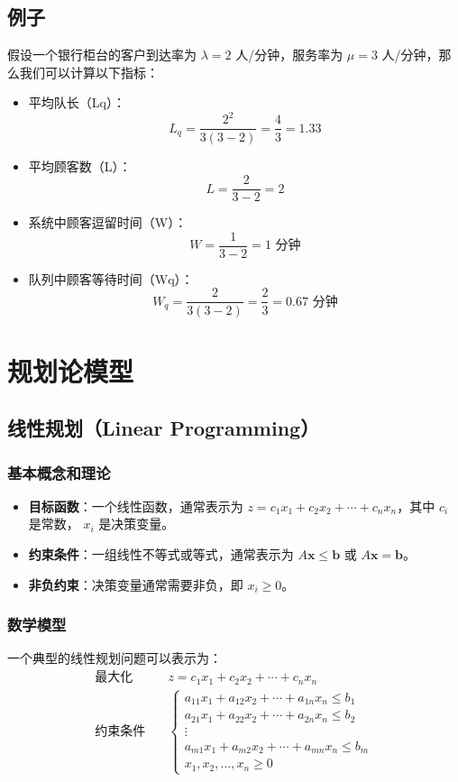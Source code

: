 \documentclass[UTF8]{ctexart}
\begin{document}
\subsection {例子}
假设一个银行柜台的客户到达率为 \(\lambda=2\) 人/分钟，服务率为 \(\mu=3\) 人/分钟，那么我们可以计算以下指标：

\begin{itemize}
    \item 平均队长（Lq）：
    \[
    L_q = \frac{2^2}{3(3-2)} = \frac{4}{3} = 1.33
    \]

    \item 平均顾客数（L）：
    \[
    L = \frac{2}{3-2} = 2
    \]

    \item 系统中顾客逗留时间（W）：
    \[
    W = \frac{1}{3-2} = 1 \text{ 分钟}
    \]

    \item 队列中顾客等待时间（Wq）：
    \[
    W_q = \frac{2}{3(3-2)} = \frac{2}{3} = 0.67 \text{ 分钟}
    \]
\end{itemize}

\newpage

\section {规划论模型}
\subsection {线性规划（Linear Programming）}
\subsubsection {基本概念和理论}
\begin{itemize}
    \item \textbf{目标函数}：一个线性函数，通常表示为 \( z = c_1 x_1 + c_2 x_2 + \cdots + c_n x_n \)，其中 \( c_i \) 是常数， \( x_i \) 是决策变量。
    \item \textbf{约束条件}：一组线性不等式或等式，通常表示为 \( A \mathbf{x} \leq \mathbf{b} \) 或 \( A \mathbf{x} = \mathbf{b} \)。
    \item \textbf{非负约束}：决策变量通常需要非负，即 \( x_i \geq 0 \)。
\end{itemize}

\subsubsection {数学模型}
一个典型的线性规划问题可以表示为：
\[
\begin{aligned}
\text{最大化} & \quad z = c_1 x_1 + c_2 x_2 + \cdots + c_n x_n \\
\text{约束条件} & \quad 
\begin{cases}
a_{11} x_1 + a_{12} x_2 + \cdots + a_{1n} x_n \leq b_1 \\
a_{21} x_1 + a_{22} x_2 + \cdots + a_{2n} x_n \leq b_2 \\
\vdots \\
a_{m1} x_1 + a_{m2} x_2 + \cdots + a_{mn} x_n \leq b_m \\
x_1, x_2, \ldots, x_n \geq 0
\end{cases}
\end{aligned}
\]
\end{document}
